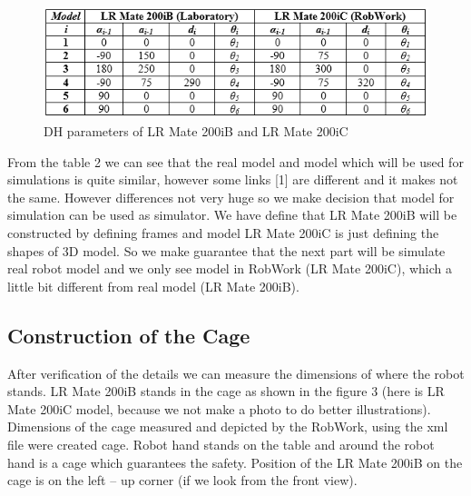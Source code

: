 \begin{figure}[H]
  \centering
  \includegraphics[scale= 0.8]{source/table2.png}
  \caption{DH parameters of LR Mate 200iB and LR Mate 200iC}
  \label{fig:tableParameters}
\end{figure}

From the table 2 we can see that the real model and model which will be used for simulations is quite similar, however some links [1] are different and it makes not the same. However differences not very huge so we make decision that model for simulation can be used as simulator. We have define that LR Mate 200iB will be constructed by defining frames and model LR Mate 200iC is just defining the shapes of 3D model. So we make guarantee that the next part will be simulate real robot model and we only see model in RobWork (LR Mate 200iC), which a little bit different from real model (LR Mate 200iB).

\subsection{Construction of the Cage}
After verification of the details we can measure the dimensions of where the robot stands. LR Mate 200iB stands in the cage as shown in the figure 3 (here is LR Mate 200iC model, because we not make a photo to do better illustrations). Dimensions of the cage measured and depicted by the RobWork, using the xml file were created cage. Robot hand stands on the table and around the robot hand is a cage which guarantees the safety. Position of the LR Mate 200iB on the cage is on the left – up corner (if we look from the front view).

